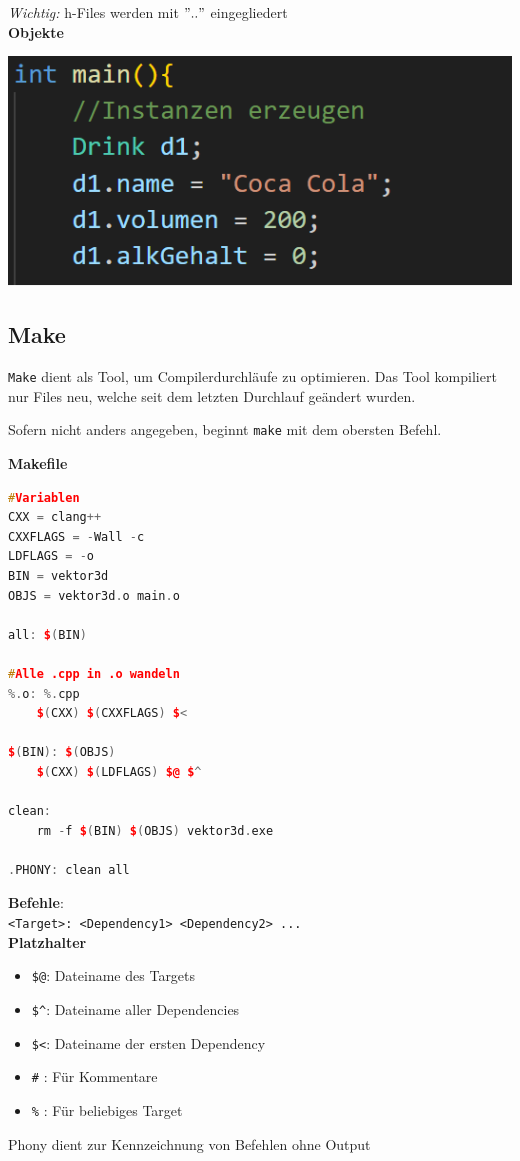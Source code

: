             \textit{Wichtig:} h-Files werden mit $".."$ eingegliedert
            \\
            \textbf{Objekte}
            
            \includegraphics[width=0.7\linewidth]{Bilder/cpp_klassen-objekte.png}

    \subsection{Make}
        \verb|Make| dient als Tool, um Compilerdurchläufe zu optimieren.
        Das Tool kompiliert nur Files neu, welche seit dem letzten Durchlauf geändert wurden.

        Sofern nicht anders angegeben, beginnt \verb|make| mit dem obersten Befehl.

        \begin{minipage}{0.5\linewidth}
            \textbf{Makefile}
            \begin{lstlisting}[language=C++]
#Variablen
CXX = clang++
CXXFLAGS = -Wall -c
LDFLAGS = -o
BIN = vektor3d
OBJS = vektor3d.o main.o

all: $(BIN)

#Alle .cpp in .o wandeln
%.o: %.cpp
	$(CXX) $(CXXFLAGS) $<

$(BIN): $(OBJS)
	$(CXX) $(LDFLAGS) $@ $^

clean:
	rm -f $(BIN) $(OBJS) vektor3d.exe

.PHONY: clean all
            \end{lstlisting}
        \end{minipage}
        \hfill
        \begin{minipage}{0.45\linewidth}
            \textbf{Befehle}:\\
            \verb|<Target>: <Dependency1> <Dependency2> ...|\\
            \textbf{Platzhalter}
            \begin{itemize}
                \item \verb|$@|: Dateiname des Targets
                \item \verb|$^|: Dateiname aller Dependencies
                \item \verb|$<|: Dateiname der ersten Dependency
                \item \verb|#| : Für Kommentare
                \item \verb|%| : Für beliebiges Target
            \end{itemize}

            Phony dient zur Kennzeichnung von Befehlen ohne Output
        \end{minipage}



